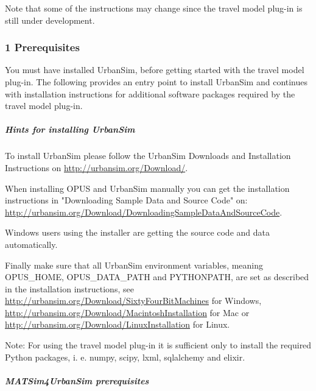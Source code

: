 \documentclass[a4paper,11pt]{report}
\begin{document}
Note that some of the instructions may change since the travel model plug-in is still under development.

\subsubsection{1 Prerequisites}

You must have installed UrbanSim, before getting started with the  travel model plug-in. The following provides an entry point to install  UrbanSim and continues with installation instructions for additional  software packages required by the travel model plug-in.

\subparagraph{Hints for installing UrbanSim}

To install UrbanSim please follow the UrbanSim Downloads and Installation Instructions on \href{http://urbansim.org/Download/}{http://urbansim.org/Download/}.

When installing OPUS and UrbanSim manually you can get the  installation instructions in "Downloading Sample Data and Source Code"  on: \href{http://urbansim.org/Download/DownloadingSampleDataAndSourceCode}{http://urbansim.org/Download/DownloadingSampleDataAndSourceCode}.

Windows users using the installer are getting the source code and data automatically.

Finally make sure that all UrbanSim environment variables, meaning  OPUS\_HOME, OPUS\_DATA\_PATH and PYTHONPATH, are set as described in the  installation instructions, see \href{http://urbansim.org/Download/SixtyFourBitMachines}{http://urbansim.org/Download/SixtyFourBitMachines} for Windows, \href{http://urbansim.org/Download/MacintoshInstallation}{http://urbansim.org/Download/MacintoshInstallation} for Mac or \href{http://urbansim.org/Download/LinuxInstallation}{http://urbansim.org/Download/LinuxInstallation} for Linux.

Note:  For using the travel model plug-in it is sufficient only to install the  required Python packages, i. e. numpy, scipy, lxml, sqlalchemy and  elixir.

\subparagraph{MATSim4UrbanSim prerequisites}
\end{document}
